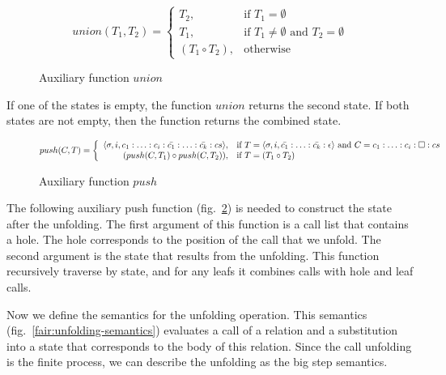 \begin{figure}[h!]
\[
union(T_1, T_2) =
\left\{
\begin{array}{rl}
T_2, & \mbox{if } T_1 = \emptyset \\
T_1, & \mbox{if } T_1 \not= \emptyset \mbox{ and } T_2 = \emptyset \\
(T_1 \circ T_2), & \mbox{otherwise}
\end{array}
\right.
\]
\caption{Auxiliary function $union$}
\label{fair:union-semantics}
\end{figure}


If one of the states is empty, the function $union$ returns the second state. If both states are not empty, then the function returns the combined state.

\begin{figure}[h!]
\[
push(C, T) =
\left\{
\begin{array}{rl}
\langle \sigma, i, c_1 : \ldots : c_i : \bar{c_1} : \ldots : \bar{c_k} : cs \rangle, & \mbox{if } T = \langle \sigma, i, \bar{c_1} : \ldots : \bar{c_k} : \epsilon \rangle \mbox{ and } C = c_1 : \ldots : c_i : \Box : cs \\
(push(C, T_1) \circ push(C, T_2)), & \mbox{if } T = (T_1 \circ T_2)
\end{array}
\right.
\]
\caption{Auxiliary function $push$}
\label{fair:push-semantics}
\end{figure}


The following auxiliary push function (fig.~\ref{fair:push-semantics}) is needed to construct the state after the unfolding. 
The first argument of this function is a call list that contains a hole. 
The hole corresponds to the position of the call that we unfold. 
The second argument is the state that results from the unfolding. 
This function recursively traverse by state, and for any leafs it combines calls with hole and leaf calls.

Now we define the semantics for the unfolding operation. This semantics (fig.~\ref{fair:unfolding-semantics}) evaluates a call of a relation and a substitution into a state that corresponds to the body of this relation. Since the call unfolding is the finite process, we can describe the unfolding as the big step semantics.

